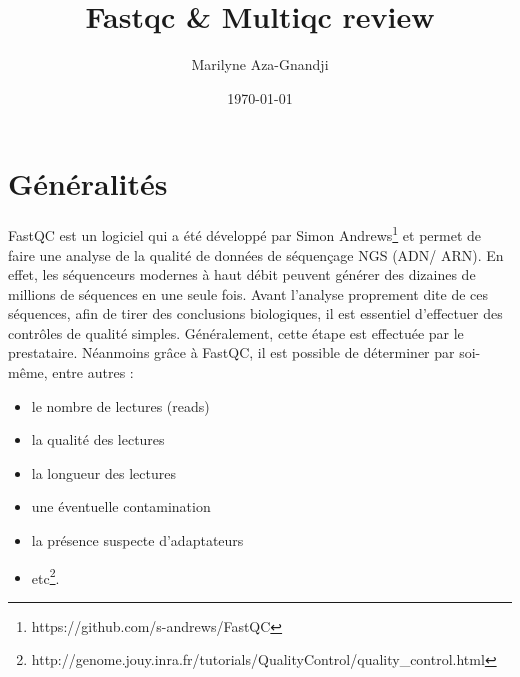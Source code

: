 \documentclass[a4paper,11pt]{article}
\begin{document}
\title{Fastqc \& Multiqc review} \author{Marilyne Aza-Gnandji}
\date{\today}

\maketitle \tableofcontents

\section{Généralités}

FastQC est un logiciel qui a été développé par Simon
Andrews\footnote{{https://github.com/s-andrews/FastQC}} et permet de
faire une analyse de la qualité de données de séquençage NGS (ADN/
ARN). En effet, les séquenceurs modernes à haut débit peuvent générer
des dizaines de millions de séquences en une seule fois.  Avant
l'analyse proprement dite de ces séquences, afin de tirer des
conclusions biologiques, il est essentiel d'effectuer des contrôles de
qualité simples. Généralement, cette étape est effectuée par le
prestataire. Néanmoins grâce à FastQC, il est possible de déterminer
par soi-même, entre autres :
\begin{itemize}
\item[\textbullet] le nombre de lectures (reads)
\item[\textbullet] la qualité des lectures
\item[\textbullet] la longueur des lectures
\item[\textbullet] une éventuelle contamination
\item[\textbullet] la présence suspecte d'adaptateurs
\item[\textbullet]
  etc\footnote{{http://genome.jouy.inra.fr/tutorials/QualityControl/quality_control.html}}.
\end{itemize}
\end{document}
